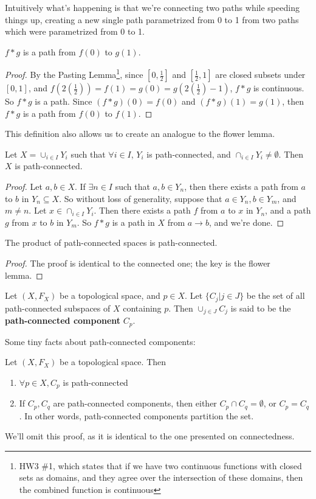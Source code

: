 Intuitively what's happening is that we're connecting two paths while speeding things up, creating a new single path parametrized from 0 to 1 from two paths which were parametrized from 0 to 1. 
\begin{smallfact}
$f\ast g$ is a path from $f(0)$ to $g(1)$. 
\end{smallfact}
\begin{proof}
By the Pasting Lemma\footnote{HW3 \#1, which states that if we have two continuous functions with closed sets as domains, and they agree over the intersection of these domains, then the combined function is continuous}, since $[0,\frac{1}{2}]$ and $[\frac{1}{2},1]$ are closed subsets under $[0,1]$, and $f(2 (\frac{1}{2} )) = f(1) = g(0) = g(2 (\frac{1}{2}) - 1 )$, $f\ast g$ is continuous. So $f\ast g$ is a path. Since $(f\ast g)(0) = f(0)$ and $(f\ast g) (1) = g(1)$, then $f\ast g$ is a path from $f(0)$ to $f(1)$. 
\end{proof}

This definition also allows us to create an analogue to the flower lemma. 
\begin{theorem}
 Let $X = \cup_{i\in I} Y_i$ such that $\forall i\in I$, $Y_i$ is path-connected, and $\cap_{i\in I} Y_i \neq \emptyset$. Then $X$ is path-connected. 
\end{theorem}
\begin{proof}
Let $a,b\in X$. If $\exists n\in I$ such that $a,b\in Y_n$, then there exists a path from $a$ to $b$ in $Y_n\subseteq X$. So without loss of generality, suppose that $a\in Y_n, b\in Y_m$, and $m\neq n$. Let $x\in \cap_{i\in I} Y_i$. Then there exists a path $f$ from $a$ to $x$ in $Y_n$, and a path $g$ from $x$ to $b$ in $Y_m$. So $f\ast g$ is a path in $X$ from $a \to b$, and we're done. 
\end{proof}
\begin{corollary}
The product of path-connected spaces is path-connected. 
\end{corollary}
\begin{proof}
The proof is identical to the connected one; the key is the flower lemma. 
\end{proof}
\begin{definition}
Let $(X,F_X)$ be a topological space, and $p\in X$. Let $\{C_j | j\in J\}$ be the set of all path-connected subspaces of $X$ containing $p$. Then $\cup_{j\in J} C_j$ is said to be the \textbf{path-connected component} $C_p$. 
\end{definition}

Some tiny facts about path-connected components:

Let $(X,F_X)$ be a topological space. Then 
\begin{enumerate}
\item $\forall p\in X, C_p$ is path-connected 
\item If $C_p, C_q$ are path-connected components, then either $C_p \cap C_q = \emptyset$, or $C_p = C_q$. In other words, path-connected components partition the set. 
\end{enumerate}
We'll omit this proof, as it is identical to the one presented on connectedness. 
